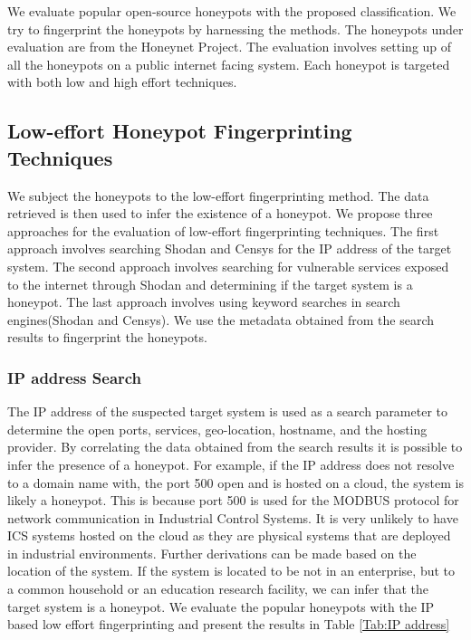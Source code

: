 \documentclass[../main.tex]{subfiles}
\begin{document}
We evaluate popular open-source honeypots with the proposed classification. We try to fingerprint the honeypots by harnessing the methods. The honeypots under evaluation are from the Honeynet Project. The evaluation involves setting up of all the honeypots on a public internet facing system. Each honeypot is targeted with both low and high effort techniques. 
 
\subsection{Low-effort Honeypot Fingerprinting Techniques}
 We subject the honeypots to the low-effort fingerprinting method. The data retrieved is then used to infer the existence of a honeypot. We propose three approaches for the evaluation of low-effort fingerprinting techniques. The first approach involves searching Shodan and Censys for the IP address of the target system. The second approach involves searching for vulnerable services exposed to the internet through Shodan and determining if the target system is a honeypot. The last approach involves using keyword searches in search engines(Shodan and Censys). We use the metadata obtained from the search results to fingerprint the honeypots. 
 
 \subsubsection{IP address Search}
The IP address of the suspected target system is used as a search parameter to determine the open ports, services, geo-location, hostname, and the hosting provider. By correlating the data obtained from the search results it is possible to infer the presence of a honeypot. For example, if the IP address does not resolve to a domain name with, the port 500 open and is hosted on a cloud, the system is likely a honeypot. This is because port 500 is used for the MODBUS protocol for network communication in Industrial Control Systems. It is very unlikely to have ICS systems hosted on the cloud as they are physical systems that are deployed in industrial environments.  Further derivations can be made based on the location of the system. If the system is located to be not in an enterprise, but to a common household or an education research facility, we can infer that the target system is a honeypot. We  evaluate the popular honeypots with the IP based low effort fingerprinting and present the results in Table \ref{Tab:IP address}
\end{document}
